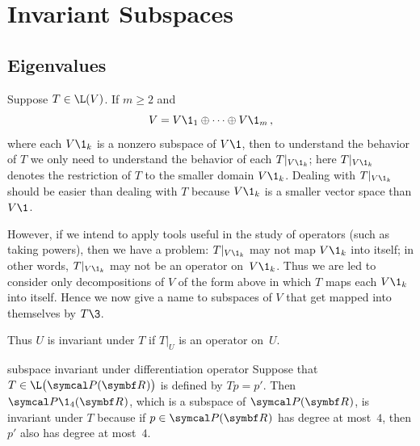 \section{Invariant Subspaces} \label{5invar}

\subsection{Eigenvalues}




Suppose $T \in \L(V)$.  If $m \ge 2$ and
\[
V = V\1_1 \oplus \dots \oplus V\1_m\, ,
\]
where each $V\1_k$ is a nonzero subspace of $V\1$, then to understand the behavior
of $T$ we only need to understand the behavior of each $T|_{V\1_k}$;
here $T|_{V\1_k}$  denotes the restriction of $T$ to the smaller domain $V\1_k$.  Dealing
with $T|_{V\1_k}$ should be easier than dealing with $T$ because $V\1_k$ is a smaller
vector space than $V\1$.

However, if we intend to apply tools useful in the study of operators (such as taking powers), then we have a problem: $T|_{V\1_k}$ may not map $V\1_k$ into itself; in other words, $T|_{V\1_k}$ may not be an operator on~$V\1_k$.  Thus we are led to consider only decompositions of $V$ of the form above in which $T$ maps each $V\1_k$ into itself. Hence we now give a name to subspaces of $V$ that get mapped into themselves by $T\3$.


Thus $U$ is invariant under $T$ if $T|_U$ is an operator on~$U$.

\begin{example}{subspace invariant under differentiation operator}
Suppose that $T \in \L\bigl(\P(\R{})\bigr)$ is defined by $Tp = p'\!$. Then $\P\1_4(\R{})$, which is a subspace of
$\P(\R{})$, is invariant under $T$ because if $p \in \P(\R{})$ has
degree at most~$4$, then $p'$ also has degree at most~$4$.
\end{example}

